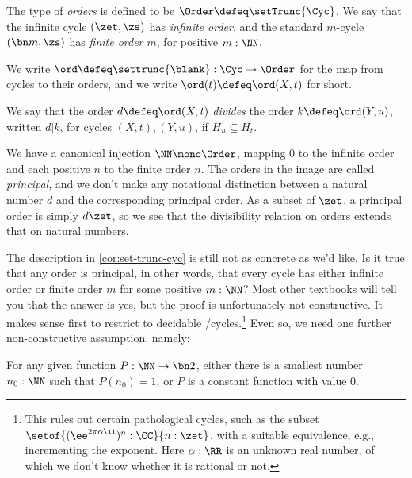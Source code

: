 \begin{definition}\label{def:Order}
  The type of \emph{orders} is defined to be
  $\Order\defeq\setTrunc{\Cyc}$.
  We say that the infinite cycle $(\zet,\zs)$ has \emph{infinite order},
  and the standard $m$-cycle $(\bn m,\zs)$ has \emph{finite order $m$},
  for positive $m:\NN$.

  We write $\ord\defeq\settrunc{\blank}:\Cyc\to\Order$ for the map
  from cycles to their orders, and we write $\ord(t)\defeq\ord(X,t)$ for short.

  We say that the order $d\defeq\ord(X,t)$ \emph{divides} the order $k\defeq\ord(Y,u)$, written $d | k$,
  for cycles $(X,t),(Y,u)$, if $H_u \subseteq H_t$.
\end{definition}
We have a canonical injection $\NN \mono \Order$,
mapping $0$ to the infinite order and each positive $n$ to the finite order $n$.
The orders in the image are called \emph{principal},
and we don't make any notational distinction between a natural number $d$
and the corresponding principal order.
As a subset of $\zet$, a principal order is simply $d\zet$,
so we see that the divisibility relation on orders extends that on natural numbers.

The description in \cref{cor:set-trunc-cyc} is still not as concrete as we'd like.
Is it true that any order is principal, in other words,
that every cycle has either infinite order or finite order $m$
for some positive $m:\NN$?
Most other textbooks will tell you that the answer is yes,
but the proof is unfortunately not constructive.
It makes sense first to restrict to decidable \coverings/cycles.\footnote{%
  This rules out certain pathological cycles,
  such as the subset $\setof{(\ee^{2\pi\alpha\ii})^n:\CC}{n:\zet}$,
  with a suitable equivalence, e.g., incrementing the exponent.
  Here $\alpha:\RR$ is an unknown real number,
  of which we don't know whether it is rational or not.}
Even so, we need one further non-constructive assumption, namely:

\begin{principle}
  \label{LPO}%
  For any given function $P:\NN\to\bn 2$,
  either there is a smallest number $n_0:\NN$ such that $P(n_0)=1$,
  or $P$ is a constant function with value $0$.
\end{principle}


